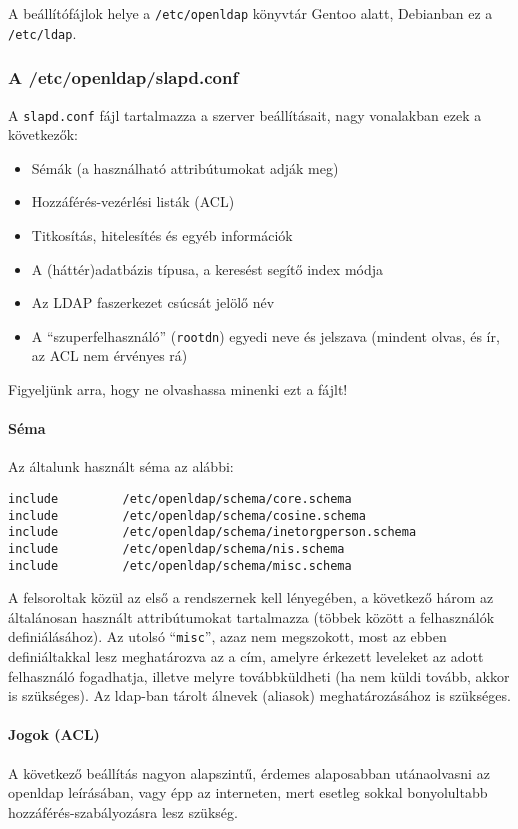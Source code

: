 A beállítófájlok helye a \texttt{/etc/openldap} könyvtár Gentoo alatt, Debianban ez a \texttt{/etc/ldap}.

\subsubsection{A /etc/openldap/slapd.conf}
A \texttt{slapd.conf} fájl tartalmazza a szerver beállításait, nagy vonalakban ezek a következők:

\begin{itemize}
\item Sémák (a használható attribútumokat adják meg)
\item Hozzáférés-vezérlési listák (ACL)
\item Titkosítás, hitelesítés és egyéb információk
\item A (háttér)adatbázis típusa, a keresést segítő index módja
\item Az LDAP faszerkezet csúcsát jelölő név
\item A ``szuperfelhasználó'' (\texttt{rootdn}) egyedi neve és jelszava (mindent olvas, és ír, az ACL nem érvényes rá)
\end{itemize}  

Figyeljünk arra, hogy ne olvashassa minenki ezt a fájlt!

\paragraph{Séma} Az általunk használt séma az alábbi:

\begin{Verbatim}
include         /etc/openldap/schema/core.schema
include         /etc/openldap/schema/cosine.schema
include         /etc/openldap/schema/inetorgperson.schema
include         /etc/openldap/schema/nis.schema
include         /etc/openldap/schema/misc.schema
\end{Verbatim}
  
A felsoroltak közül az első a rendszernek kell lényegében, a következő három az általánosan használt attribútumokat tartalmazza
(többek között a felhasználók definiálásához). Az utolsó ``\texttt{misc}'', azaz nem megszokott, most az ebben
definiáltakkal lesz meghatározva az a cím, amelyre érkezett leveleket az adott felhasználó fogadhatja, illetve melyre
továbbküldheti (ha nem küldi tovább, akkor is szükséges). Az ldap-ban tárolt álnevek (aliasok) meghatározásához is
szükséges.

\paragraph{Jogok (ACL)} A következő beállítás nagyon alapszintű, érdemes alaposabban utánaolvasni az openldap
leírásában, vagy épp az interneten, mert esetleg sokkal bonyolultabb hozzáférés-szabályozásra lesz szükség.

